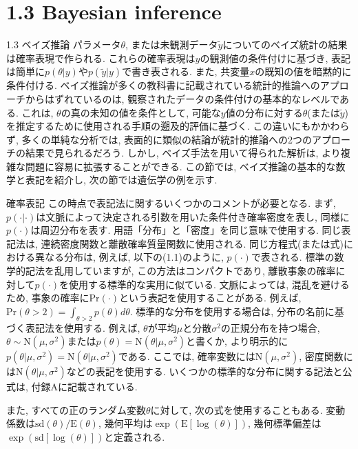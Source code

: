 \documentclass[10pt,dvipdfmx,a4]{beamer}
\begin{document}
\section{1.3 Bayesian inference}
\begin{frame}{1.3 ベイズ推論}
パラメータ$\theta$, または未観測データ$\tilde{y}$についてのベイズ統計の結果は確率表現で作られる.
これらの確率表現は$y$の観測値の条件付けに基づき, 表記は簡単に$p(\theta|y)$や$p(\tilde{y}|y)$で書き表される.
また, 共変量$x$の既知の値を暗黙的に条件付ける.
ベイズ推論が多くの教科書に記載されている統計的推論へのアプローチからはずれているのは, 観察されたデータの条件付けの基本的なレベルである.
これは, $\theta$の真の未知の値を条件として, 可能な$y$値の分布に対する$\theta$(または$\tilde{y}$)を推定するために使用される手順の遡及的評価に基づく.
この違いにもかかわらず, 多くの単純な分析では, 表面的に類似の結論が統計的推論への2つのアプローチの結果で見られるだろう.
しかし, ベイズ手法を用いて得られた解析は, より複雑な問題に容易に拡張することができる.
この節では, ベイズ推論の基本的な数学と表記を紹介し, 次の節では遺伝学の例を示す.
\end{frame}


\begin{frame}{確率表記}
この時点で表記法に関するいくつかのコメントが必要となる.
まず, $p(\cdot|\cdot)$は文脈によって決定される引数を用いた条件付き確率密度を表し, 同様に$p(\cdot)$は周辺分布を表す.
用語「分布」と「密度」を同じ意味で使用する.
同じ表記法は, 連続密度関数と離散確率質量関数に使用される.
同じ方程式(または式)における異なる分布は, 例えば, 以下の(1.1)のように, $p(\cdot)$で表される.
標準の数学的記法を乱用していますが, この方法はコンパクトであり, 離散事象の確率に対して$p(\cdot)$を使用する標準的な実用に似ている.
文脈によっては, 混乱を避けるため, 事象の確率に$\text{Pr}(\cdot)$という表記を使用することがある.
例えば, $\text{Pr}(\theta>2)=\int_{\theta>2} p(\theta)d\theta$.
標準的な分布を使用する場合は, 分布の名前に基づく表記法を使用する.
例えば, $\theta$が平均$\mu$と分散$\sigma^2$の正規分布を持つ場合, $\theta \sim \text{N}(\mu,\sigma^2)$または$p(\theta)=\text{N}(\theta|\mu,\sigma^2)$と書くか, より明示的に$p(\theta|\mu,\sigma^2)=\text{N}(\theta|\mu,\sigma^2)$である.
ここでは, 確率変数には$\text{N}(\mu,\sigma^2)$, 密度関数には$\text{N}(\theta|\mu,\sigma^2)$などの表記を使用する.
いくつかの標準的な分布に関する記法と公式は, 付録Aに記載されている.

また, すべての正のランダム変数$\theta$に対して, 次の式を使用することもある.
変動係数は$\text{sd}(\theta)/\text{E}(\theta)$, 幾何平均は$\exp(\text{E}[\log(\theta)])$, 幾何標準偏差は$\exp(\text{sd}[\log(\theta)])$と定義される.

\end{frame}
\end{document}
